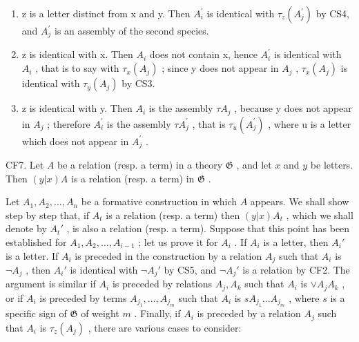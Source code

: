 \begin{enumerate}
\def\labelenumi{(\alph{enumi})}
\item
  z is a letter distinct from x and y. Then \(A_{i}^{\prime}\) is identical with \(\tau_{z}(A_{j}^{\prime})\) by CS4, and \(A_{j}^{\prime}\) is an assembly of the second species.
\item
  z is identical with x. Then \(A_{i}\) does not contain x, hence \(A_{i}^{\prime}\) is identical with \(A_{i}\) , that is to say with \(\tau_{x}(A_{j})\) ; since y does not appear in \(A_{j}\) , \(\tau_{x}(A_{j})\) is identical with \(\tau_{y}(A_{j})\) by CS3.
\item
  z is identical with y. Then \(A_{i}\) is the assembly \(\tau A_{j}\) , because y does not appear in \(A_{j}\) ; therefore \(A_{i}^{\prime}\) is the assembly \(\tau A_{j}^{\prime}\) , that is \(\tau_{u}(A_{j}^{\prime})\) , where u is a letter which does not appear in \(A_{j}^{\prime}\) .
\end{enumerate}

CF7. Let \(A\) be a relation (resp. a term) in a theory \(\mathfrak{G}\) , and let \(x\) and \(y\) be letters. Then \((y|x)A\) is a relation (resp. a term) in \(\mathfrak{G}\) .

Let \(A_1, A_2, \ldots, A_n\) be a formative construction in which \(A\) appears. We shall show step by step that, if \(A_t\) is a relation (resp. a term) then \((y|x)A_t\) , which we shall denote by \(A_t'\) , is also a relation (resp. a term). Suppose that this point has been established for \(A_1, A_2, \ldots, A_{i-1}\) ; let us prove it for \(A_i\) . If \(A_i\) is a letter, then \(A_i'\) is a letter. If \(A_i\) is preceded in the construction by a relation \(A_j\) such that \(A_i\) is \(\neg A_j\) , then \(A_i'\) is identical with \(\neg A_j'\) by CS5, and \(\neg A_j'\) is a relation by CF2. The argument is similar if \(A_i\) is preceded by relations \(A_j, A_k\) such that \(A_i\) is \(\vee A_jA_k\) , or if \(A_i\) is preceded by terms \(A_{j_1}, \ldots, A_{j_m}\) such that \(A_i\) is \(sA_{j_1}\ldots A_{j_m}\) , where \(s\) is a specific sign of \(\mathfrak{G}\) of weight \(m\) . Finally, if \(A_i\) is preceded by a relation \(A_j\) such that \(A_i\) is \(\tau_z(A_j)\) , there are various cases to consider:

